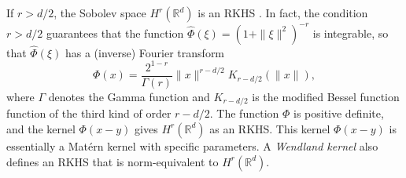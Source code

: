 \documentclass[11pt]{article}
\theoremstyle{remark}
\theoremstyle{example}
\theoremstyle{remark}
\newcommand{\N}{\mathbb{N}}
\newcommand{\R}{\mathbb{R}}
\newcommand{\blue}{\textcolor{blue}}
\newcommand{\citep}{\cite}
\newcommand{\citealp}{\cite}
\begin{document}
If $r > d/2$, the Sobolev space $H^r(\R^d)$ is an RKHS \cite[Section 10]{Wen05}. 
In fact, the condition $r > d/2$ guarantees that the function $\hat{\Phi}(\xi) = (1 + \| \xi \|^2)^{-r}$ is integrable, so that $\hat{\Phi}(\xi)$ has a (inverse) Fourier transform
\[
\Phi(x) = \frac{2^{1-r}}{\Gamma(r)} \| x \|^{r-d/2} K_{r-d/2} (\| x \|),
\]
where $\Gamma$ denotes the Gamma function and $K_{r-d/2}$ is the modified Bessel function function of the third kind of order $r-d/2$. The function $\Phi$ is positive definite, and the kernel $\Phi(x-y)$ gives $H^r(\R^d)$ as an RKHS.
This kernel $\Phi(x-y)$ is essentially a Mat\'ern kernel \citep{Mat60,Mat86} with specific parameters.
A {\em Wendland kernel} \citep{Wen95} also defines an RKHS that is norm-equivalent to $H^r(\R^d)$.



\begin{comment}

\subsubsection{Sobolev spaces of dominating mixed smoothness.} 
\label{sec:sob_dom}
While this paper deals with Sobolev spaces as introduced above, which are isotropic,  we mention that there is another class of Sobolev spaces defined on $[0,1]^d$ which are also popular in the QMC literature, that is,  {\em Sobolev spaces of dominating mixed smoothness} (e.g.~see \citealp{NovWoz10,DicKuoSlo13}).
A Sobolev space of dominating mixed smoothness $W_{\rm dom}^r([0,1]^d)$ of order $r \in \N$ is defined as a function space in which each function $f$ has (square-integrable) mixed partial derivatives up to degree $r$ in {\em each} variable, that is,
\begin{equation}
W_{\rm dom}^r([0,1]^d)  = \left\{ f \in L_2([0,1]^d): \partial^\alpha f \in L_2([0,1]^d),\ \ \forall \alpha \in \mathbb{N}_0^d \ {\rm with}\ |\alpha| \leq r  \right\}.
\end{equation}
Alternatively, it can be defined as a tensor product of one-dimensional Sobolev spaces: $W_{\rm dom}^r([0,1]^d) := W_2^r([0,1]) \otimes \cdots \otimes W_2^r([0,1])$.
This is an anisotropic Sobolev space, as a higher order of smoothness is assumed in the direction of each coordinate than in the other directions. 
By focusing on such anistropic spaces, it is expected that quadrature rules may avoid the curse of dimensionality \cite[Section 3]{Nov16}.

\end{comment}
\end{document}
